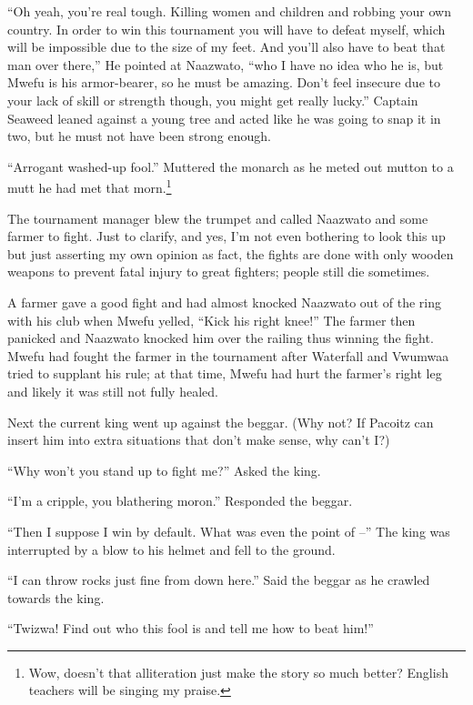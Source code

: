 ``Oh yeah, you're real tough. Killing women and children and robbing your own country. In order to win this tournament you will have to defeat myself, which will be impossible due to the size of my feet. And you'll also have to beat that man over there,'' He pointed at Naa\-zwa\-to, ``who I have no idea who he is, but Mwe\-fu is his armor-bearer, so he must be amazing. Don't feel insecure due to your lack of skill or strength though, you might get really lucky.'' Captain Seaweed leaned against a young tree and acted like he was going to snap it in two, but he must not have been strong enough.

``Arrogant washed-up fool.'' Muttered the monarch as he meted out mutton to a mutt he had met that morn.\footnote{Wow, doesn't that alliteration just make the story so much better? English teachers will be singing my praise.}

\tbreak

The tournament manager blew the trumpet and called Naa\-zwa\-to and some farmer to fight. Just to clarify, and yes, I'm not even bothering to look this up but just asserting my own opinion as fact, the fights are done with only wooden weapons to prevent fatal injury to great fighters; people still die sometimes.

A farmer gave a good fight and had almost knocked Naa\-zwa\-to out of the ring with his club when Mwe\-fu yelled, ``Kick his right knee!'' The farmer then panicked and Naa\-zwa\-to knocked him over the railing thus winning the fight. Mwe\-fu had fought the farmer in the tournament after Waterfall and Vwu\-mwaa tried to supplant his rule; at that time, Mwe\-fu had hurt the farmer's right leg and likely it was still not fully healed. 

Next the current king went up against the beggar. (Why not? If Pa\-co\-itz can insert him into extra situations that don't make sense, why can't I?)

``Why won't you stand up to fight me?'' Asked the king.

``I'm a cripple, you blathering moron.'' Responded the beggar.

``Then I suppose I win by default. What was even the point of --'' The king was interrupted by a blow to his helmet and fell to the ground.

``I can throw rocks just fine from down here.'' Said the beggar as he crawled towards the king.

``Twi\-zwa! Find out who this fool is and tell me how to beat him!''

